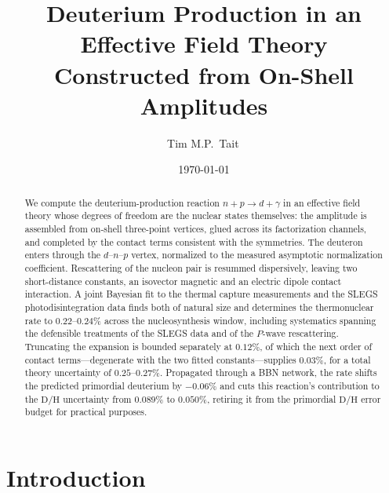 \documentclass[
  aps,prd,twocolumn,nofootinbib,superscriptaddress,
  longbibliography,floatfix,preprintnumbers
]{revtex4-2}
\newcommand{\npdg}{n+p\to d+\gamma}
\begin{document}

\title{Deuterium Production in an Effective Field Theory\\ Constructed from On-Shell Amplitudes}

\author{Tim M.P.~Tait\,}

\date{\today}

\begin{abstract}
We compute the deuterium-production reaction $\npdg$ in an effective field
theory whose degrees of freedom are the nuclear states themselves: the
amplitude is assembled from on-shell three-point vertices, glued across its
factorization channels, and completed by the contact terms consistent with the
symmetries. The deuteron enters through the $d$--$n$--$p$ vertex, normalized to
the measured asymptotic normalization coefficient.
Rescattering of the nucleon pair is resummed dispersively, leaving two
short-distance constants, an isovector magnetic and an electric dipole
contact interaction. A joint Bayesian fit to the thermal capture measurements and the
SLEGS photodisintegration data finds both of natural size and determines the
thermonuclear rate to $0.22$--$0.24\%$ across the nucleosynthesis window,
including systematics spanning the defensible treatments of the SLEGS data and of
the $P$-wave rescattering. Truncating the expansion is bounded separately at
$0.12\%$, of which the next order of contact terms---degenerate with the two fitted
constants---supplies $0.03\%$, for a total theory uncertainty of $0.25$--$0.27\%$.
Propagated through a BBN network, the rate shifts the
predicted primordial deuterium by $-0.06\%$ and cuts this reaction's
contribution to the $\mathrm{D/H}$ uncertainty from $0.089\%$ to $0.050\%$,
retiring it from the primordial $\mathrm{D/H}$ error budget for practical purposes.
\end{abstract}

\maketitle

\section{Introduction}
\end{document}
